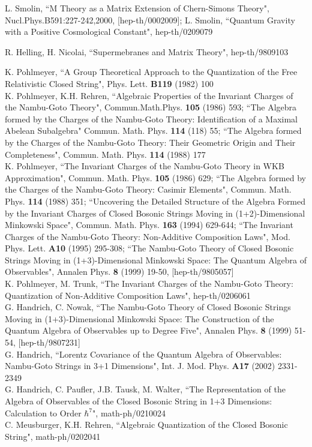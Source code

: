 \documentclass[12pt]{report}
\begin{document}
\begin{thebibliography}{99}
L. Smolin, ``M Theory as a Matrix Extension of Chern-Simons Theory",
Nucl.Phys.B591:227-242,2000, [hep-th/0002009];
L. Smolin, ``Quantum Gravity with a Positive Cosmological
Constant", hep-th/0209079

 R. Helling, H. Nicolai, ``Supermebranes and Matrix Theory",
hep-th/9809103

K. Pohlmeyer, ``A Group Theoretical Approach to the Quantization of the 
Free Relativistic Closed String", Phys. Lett. {\bf B119} (1982) 100\\
K. Pohlmeyer, K.H. Rehren,
``Algebraic Properties of the Invariant Charges of the Nambu-Goto Theory",
Commun.Math.Phys. {\bf 105} (1986) 593;
``The Algebra formed by the Charges of the Nambu-Goto Theory:
Identification of a Maximal Abelean Subalgebra"
Commun. Math. Phys. {\bf 114} (118) 55;
``The Algebra formed by the Charges of the Nambu-Goto Theory: Their 
Geometric Origin and Their Completeness", Commun. Math. Phys.
{\bf 114} (1988) 177\\
K. Pohlmeyer, ``The Invariant Charges of the Nambu-Goto Theory in WKB 
Approximation", Commun. Math. Phys. {\bf 105} (1986) 629;
``The Algebra formed by the Charges of the Nambu-Goto Theory: Casimir 
Elements", Commun. Math. Phys. {\bf 114} (1988) 351;
``Uncovering the Detailed Structure of the Algebra Formed by the Invariant
Charges of Closed Bosonic Strings Moving in (1+2)-Dimensional Minkowski 
Space", Commun. Math. Phys. {\bf 163} (1994) 629-644;
``The Invariant Charges of the Nambu-Goto Theory: Non-Additive 
Composition Laws", Mod. Phys. Lett. {\bf A10} (1995) 295-308;
``The Nambu-Goto Theory
of Closed Bosonic Strings Moving in (1+3)-Dimensional Minkowski 
Space: The Quantum Algebra of Observables", Annalen Phys. {\bf 8} 
(1999) 19-50, [hep-th/9805057]\\
K. Pohlmeyer, M. Trunk, ``The Invariant Charges of the Nambu-Goto Theory: 
Quantization of Non-Additive Composition Laws", hep-th/0206061\\
G. Handrich, C. Nowak, ``The Nambu-Goto Theory
of Closed Bosonic Strings Moving in (1+3)-Dimensional Minkowski 
Space: The Construction of the Quantum Algebra of Observables up to
Degree Five", Annalen 
Phys. {\bf 8} (1999) 51-54, [hep-th/9807231]\\
G. Handrich, ``Lorentz Covariance of the Quantum Algebra of Observables:
Nambu-Goto Strings in 3+1 Dimensions", 
Int. J. Mod. Phys. {\bf A17} (2002) 2331-2349\\
G. Handrich, C. Paufler, J.B. Tausk, M. Walter,
``The Representation of the Algebra of Observables of the Closed Bosonic String
in 1+3 Dimensions: Calculation to Order $\hbar^7$", math-ph/0210024 \\
C. Meusburger, K.H. Rehren, ``Algebraic Quantization of the Closed Bosonic 
String", math-ph/0202041 


\end{thebibliography}
\end{document}
